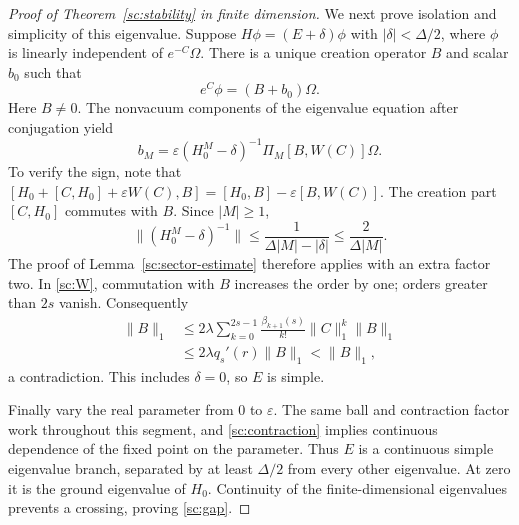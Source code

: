 \begin{proof}[Proof of Theorem~\ref{sc:stability} in finite dimension]
We next prove isolation and simplicity of this eigenvalue. Suppose
$H\phi=(E+\delta)\phi$ with $|\delta|<\Delta/2$, where $\phi$
is linearly independent of $e^{-C}\Omega$. There is a unique
creation operator $B$ and scalar $b_0$ such that
\[
 e^C\phi=(B+b_0)\Omega.
\]
Here $B\ne0$. The nonvacuum components of the eigenvalue equation
after conjugation yield
\begin{equation}
 b_M=\varepsilon(H_0^M-\delta)^{-1}
                     \Pi_M[B,W(C)]\Omega.
 \label{sc:excited-equation}
\end{equation}
To verify the sign, note that
$[H_0+[C,H_0]+\varepsilon W(C),B]
 =[H_0,B]-\varepsilon[B,W(C)]$.
The creation part $[C,H_0]$ commutes with $B$.
Since $|M|\ge1$,
\begin{equation}
 \|(H_0^M-\delta)^{-1}\|
 \le\frac{1}{\Delta|M|-|\delta|}
 \le\frac{2}{\Delta|M|}.
 \label{sc:shifted-resolvent}
\end{equation}
The proof of Lemma~\ref{sc:sector-estimate} therefore applies with
an extra factor two. In \eqref{sc:W}, commutation with $B$ increases
the order by one; orders greater than $2s$ vanish. Consequently
\begin{align}
 \|B\|_1
 &\le2\lambda\sum_{k=0}^{2s-1}
       \frac{\beta_{k+1}(s)}{k!}\|C\|_1^k\|B\|_1
 \nonumber\\
 &\le2\lambda q_s'(r)\|B\|_1<\|B\|_1,
 \label{sc:gap-contradiction}
\end{align}
a contradiction. This includes $\delta=0$, so $E$ is simple.

Finally vary the real parameter from $0$ to $\varepsilon$. The same
ball and contraction factor work throughout this segment, and
\eqref{sc:contraction} implies continuous dependence of the fixed
point on the parameter. Thus $E$ is a continuous simple eigenvalue
branch, separated by at least $\Delta/2$ from every other eigenvalue.
At zero it is the ground eigenvalue of $H_0$. Continuity of the
finite-dimensional eigenvalues prevents a crossing, proving
\eqref{sc:gap}.
\end{proof}

